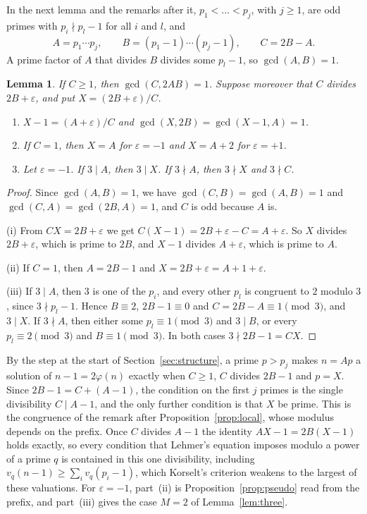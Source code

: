 \documentclass[11pt,reqno]{amsart}
\numberwithin{equation}{section}
\theoremstyle{plain}
\newtheorem{lemma}[theorem]{Lemma}
\theoremstyle{definition}
\theoremstyle{remark}
\begin{document}
In the next lemma and the remarks after it, $p_1<\dots<p_j$, with $j\ge1$, are odd primes
with $p_i\nmid p_l-1$ for all $i$ and $l$, and
\[
  A=p_1\cdots p_j,\qquad B=(p_1-1)\cdots(p_j-1),\qquad C=2B-A .
\]
A prime factor of $A$ that divides $B$ divides some $p_l-1$, so
$\gcd(A,B)=1$.

\begin{lemma}\label{lem:largest}
If $C\ge1$, then $\gcd(C,2AB)=1$. Suppose moreover that $C$ divides
$2B+\varepsilon$, and put $X=(2B+\varepsilon)/C$.
\begin{enumerate}[label=\textup{(\roman*)}]
\item $X-1=(A+\varepsilon)/C$ and $\gcd(X,2B)=\gcd(X-1,A)=1$.
\item If $C=1$, then $X=A$ for $\varepsilon=-1$ and $X=A+2$ for
$\varepsilon=+1$.
\item Let $\varepsilon=-1$. If $3\mid A$, then $3\mid X$. If $3\nmid A$,
then $3\nmid X$ and $3\nmid C$.
\end{enumerate}
\end{lemma}

\begin{proof}
Since $\gcd(A,B)=1$, we have $\gcd(C,B)=\gcd(A,B)=1$ and
$\gcd(C,A)=\gcd(2B,A)=1$, and $C$ is odd because $A$ is.

(i) From $CX=2B+\varepsilon$ we get $C(X-1)=2B+\varepsilon-C=A+\varepsilon$. So
$X$ divides $2B+\varepsilon$, which is prime to $2B$, and $X-1$ divides
$A+\varepsilon$, which is prime to $A$.

(ii) If $C=1$, then $A=2B-1$ and $X=2B+\varepsilon=A+1+\varepsilon$.

(iii) If $3\mid A$, then $3$ is one of the $p_i$, and every other $p_l$
is congruent to $2$ modulo $3$, since $3\nmid p_l-1$. Hence
$B\equiv2$, $2B-1\equiv0$ and $C=2B-A\equiv1\pmod3$, and $3\mid X$. If
$3\nmid A$, then either some $p_l\equiv1\pmod3$ and $3\mid B$, or every
$p_l\equiv2\pmod3$ and $B\equiv1\pmod3$. In both cases $3\nmid2B-1=CX$.
\end{proof}

By the step at the start of Section~\ref{sec:structure}, a prime
$p>p_j$ makes $n=Ap$ a solution of $n-1=2\varphi(n)$ exactly when
$C\ge1$, $C$ divides $2B-1$ and $p=X$. Since $2B-1=C+(A-1)$, the
condition on the first $j$ primes is the single divisibility
$C\mid A-1$, and the only further condition is that $X$ be prime. This
is the congruence of the remark after Proposition~\ref{prop:local},
whose modulus depends on the prefix. Once $C$ divides $A-1$ the identity
$AX-1=2B(X-1)$ holds exactly, so every condition that Lehmer's equation
imposes modulo a power of a prime $q$ is contained in this one
divisibility, including $v_q(n-1)\ge\sum_iv_q(p_i-1)$, which Korselt's
criterion weakens to the largest of these valuations. For
$\varepsilon=-1$, part~(ii) is Proposition~\ref{prop:pseudo} read from
the prefix, and part~(iii) gives the case $M=2$ of
Lemma~\ref{lem:three}.
\end{document}
